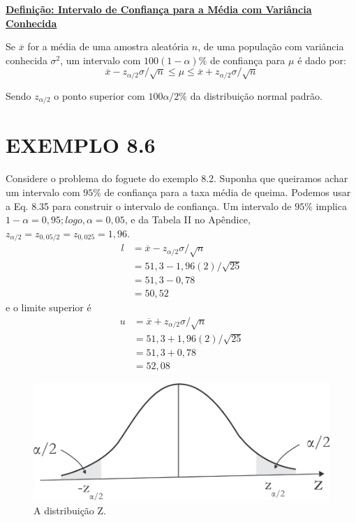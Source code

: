 \documentclass[a4paper,12pt]{article} %
\begin{document}
	
	\begin{blockquote}
		\begin{center}
			\vspace{0,2cm}
			\textbf{\underline {Definição: Intervalo de Confiança para a Média com Variância Conhecida}} \ 
		\end{center}
		
		Se $ \overline{x} $ for a média de uma amostra aleatória $n$, de uma população com variância conhecida $\sigma^2 $, um intervalo com $100\left (1 - \alpha \right)\% $ de confiança para $\mu$ é dado por:
		\begin{equation*}
			\overline{x} -z_{\alpha / 2 }{\sigma} /\sqrt{n} \leq  \mu \leq \overline{x} +z_{\alpha / 2}{\sigma} /\sqrt{n}
		\end{equation*}
		
		Sendo $z_ {\alpha / 2}$ o ponto superior com $100\alpha/2\%$ da distribuição normal padrão.
		
		\vspace{0,2cm}
		
		
		
	\end{blockquote}
	\vspace{0,2cm}
	\thispagestyle{empty}
	
	\section*{EXEMPLO 8.6}
	Considere o problema do foguete do exemplo 8.2. Suponha que queiramos achar um intervalo com $95\%$ de confiança para a taxa média de queima. Podemos usar a Eq. 8.35 para construir o intervalo de confiança. Um intervalo de $95\%$ implica $1-\alpha=0,95; logo, \alpha=0,05$, e da Tabela II no Apêndice, $z_ {\alpha / 2}= z_{0,05/2} = z_{0,025} = 1,96$.
	\vspace{0,5 cm}
	\begin{align*}
		l & = \overline{x} -z_{\alpha / 2 }{\sigma} /\sqrt{n} \\
		& = 51,3 - 1,96(2)/\sqrt{25} \\
		& = 51,3 - 0,78 \\
		& = 50,52
	\end{align*}
	e o limite superior é
	\begin{align*}
		u & = \overline{x} +z_{\alpha / 2 }{\sigma} /\sqrt{n} \\
		& = 51,3 + 1,96(2)/\sqrt{25} \\
		& = 51,3 + 0,78 \\
		& = 52,08
	\end{align*}
	\newpage 
	\begin{figure}[H]
		\centering
		\includegraphics[width=0.6\linewidth]{fig8.8}
		\caption[]{A distribuição Z.}
	\end{figure}
	
\end{document}
